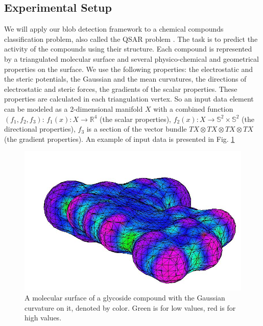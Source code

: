 \documentclass[a4paper,twoside]{article}
\newcommand{\Rone}{\mathbb{R}}
\begin{document}
\subsection{Experimental Setup}
We will apply our blob detection framework to a chemical compounds classification problem, also called the QSAR problem \cite{qsar}. The task is to predict the activity of the compounds using their structure. Each compound is represented by a triangulated molecular surface \cite{molecular} and several physico-chemical and geometrical properties on the surface. We use the following properties: the electrostatic and the steric potentials, the Gaussian and the mean curvatures, the directions of electrostatic and steric forces, the gradients of the scalar properties. These properties are calculated in each triangulation vertex. So an input data element can be modeled as a 2-dimensional manifold $X$ with a combined function $(f_1, f_2, f_3)$: $f_1(x):X \to \Rone^4$ (the scalar properties), $f_2(x):X \to \mathbb{S}^2\times\mathbb{S}^2$ (the directional properties), $f_3$ is a section of the vector bundle $TX \otimes TX \otimes TX \otimes TX$ (the gradient properties). An example of input data is presented in Fig. \ref{fig:example3}

\begin{figure}[!h]
\setlength{\lineskip}{0pt}
\vspace{-1.5cm}
  \centering
   \includegraphics[scale=0.35,natwidth=756,natheight=487]{7.png} 
  \caption{A molecular surface of a glycoside compound with the Gaussian curvature on it, denoted by color. Green is for low values, red is for high values.}
  \label{fig:example3}
 \end{figure} 
\end{document}
